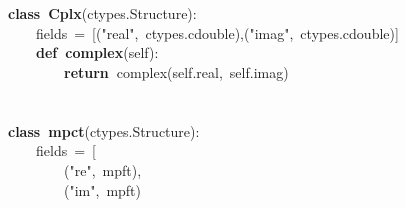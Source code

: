 \documentclass{article}\usepackage[]{graphicx}\usepackage[dvipsnames,table]{xcolor}
\makeatletter
\newcommand{\hlsng}[1]{\textcolor[rgb]{0.192,0.494,0.8}{#1}}%
\newcommand{\hlopt}[1]{\textcolor[rgb]{0,0,0}{#1}}%
\newcommand{\hldef}[1]{\textcolor[rgb]{0.345,0.345,0.345}{#1}}%
\newcommand{\hlkwa}[1]{\textcolor[rgb]{0.161,0.373,0.58}{\textbf{#1}}}%
\newcommand{\hlkwb}[1]{\textcolor[rgb]{0.69,0.353,0.396}{#1}}%
\newcommand{\hlkwd}[1]{\textcolor[rgb]{0.737,0.353,0.396}{\textbf{#1}}}%
\newenvironment{kframe}{%
 \def\at@end@of@kframe{}%
 \ifinner\ifhmode%
  \def\at@end@of@kframe{\end{minipage}}%
  \begin{minipage}{\columnwidth}%
 \fi\fi%
 \def\FrameCommand##1{\hskip\@totalleftmargin \hskip-\fboxsep
 \colorbox{shadecolor}{##1}\hskip-\fboxsep
     \hskip-\linewidth \hskip-\@totalleftmargin \hskip\columnwidth}%
 \MakeFramed {\advance\hsize-\width
   \@totalleftmargin\z@ \linewidth\hsize
   \@setminipage}}%
 {\par\unskip\endMakeFramed%
 \at@end@of@kframe}
\newenvironment{knitrout}{}{} %
\makeatother
\begin{document}
\begin{center}
\begin{minipage}[m]{15cm}
\begin{knitrout}
\begin{kframe}
\hldef{}\hspace*{\fill}\\
\hldef{}\hspace*{\fill}\\
\hldef{}\hlkwa{class\ }\hldef{}\hlkwd{Cplx}\hldef{}\hlopt{(}\hldef{ctypes}\hlopt{.}\hldef{Structure}\hlopt{):\ }\hspace*{\fill}\\
\hldef{}\hldef{\ \ \ \ }\hldef{\textunderscore fields\textunderscore \ }\hlopt{=\ {[}(}\hldef{}\hlsng{"real"}\hldef{}\hlopt{,\ }\hldef{ctypes}\hlopt{.}\hldef{c\textunderscore double}\hlopt{),(}\hldef{}\hlsng{"imag"}\hldef{}\hlopt{,\ }\hldef{ctypes}\hlopt{.}\hldef{c\textunderscore double}\hlopt{){]}}\hspace*{\fill}\\
\hldef{}\hldef{\ \ \ \ }\hldef{}\hlkwa{def\ }\hldef{}\hlkwd{\textunderscore \textunderscore complex\textunderscore \textunderscore }\hldef{}\hlopt{(}\hldef{self}\hlopt{):}\hspace*{\fill}\\
\hldef{}\hldef{\ \ \ \ \ \ \ \ }\hldef{}\hlkwa{return\ }\hldef{}\hlkwb{complex}\hldef{}\hlopt{(}\hldef{self}\hlopt{.}\hldef{real}\hlopt{,\ }\hldef{self}\hlopt{.}\hldef{imag}\hlopt{)}\hspace*{\fill}\\
\hldef{}\hspace*{\fill}\\
\hldef{}\hspace*{\fill}\\
\hldef{}\hlkwa{class\ }\hldef{}\hlkwd{mpc\textunderscore t}\hldef{}\hlopt{(}\hldef{ctypes}\hlopt{.}\hldef{Structure}\hlopt{):\ }\hspace*{\fill}\\
\hldef{}\hldef{\ \ \ \ }\hldef{\textunderscore fields\textunderscore \ }\hlopt{=\ {[}\ }\hspace*{\fill}\\
\hldef{}\hldef{\ \ \ \ \ \ \ \ }\hldef{}\hlopt{(}\hldef{}\hlsng{"re"}\hldef{}\hlopt{,\ }\hldef{mpf\textunderscore t}\hlopt{),}\hspace*{\fill}\\
\hldef{}\hldef{\ \ \ \ \ \ \ \ }\hldef{}\hlopt{(}\hldef{}\hlsng{"im"}\hldef{}\hlopt{,\ }\hldef{mpf\textunderscore t}\hlopt{)}\hspace*{\fill}\\

\end{kframe}
\end{knitrout}
\end{minipage}
\end{center}
\end{document}
